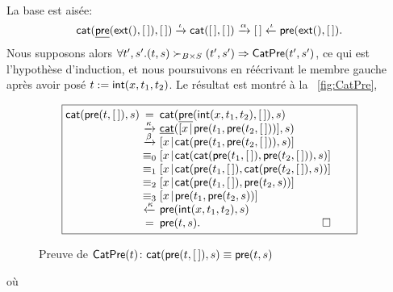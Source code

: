 La base est aisée:
\begin{equation*}
  \fun{cat}(\ufun{pre}(\fun{ext}(),\el),\el)
  \xrightarrow{\smash{\iota}} \fun{cat}(\el,\el)
  \xrightarrow{\smash{\alpha}} \el \xleftarrow{\smash{\iota}}
  \fun{pre}(\fun{ext}(),\el).
\index{cat@\fun{cat/2}}
\end{equation*}
Nous supposons alors \(\forall t',s'.(t,s) \succ_{B \times S} (t',s')
\Rightarrow \textsf{CatPre}({t',s'})\), ce qui est l'hypothèse
d'induction, et nous poursuivons en réécrivant le membre gauche après
avoir posé \(t := \textsf{int}(x,t_1,t_2)\). Le résultat est montré à la
\fig~\vref{fig:CatPre},
\begin{figure}[t]
\begin{equation*}
\boxed{%
\begin{array}{@{}r@{\;}c@{\;}l@{\qquad}}
  \fun{cat}(\fun{pre}(t,\el),s)
& =
& \fun{cat}(\ufun{pre}(\fun{int}(x,t_1,t_2),\el),s)\\
& \xrightarrow{\smash{\kappa}}
& \ufun{cat}(\cons{x}{\fun{pre}(t_1,\fun{pre}(t_2,\el))},s)\\
& \xrightarrow{\smash{\beta}}
& \cons{x}{\fun{cat}(\fun{pre}(t_1,\fun{pre}(t_2,\el)),s)}\\
& \equiv_0
& \cons{x}{\fun{cat}(\fun{cat}(\fun{pre}(t_1,\el),\fun{pre}(t_2,\el)),s)}\\
& \equiv_1
& \cons{x}{\fun{cat}(\fun{pre}(t_1,\el),\fun{cat}(\fun{pre}(t_2,\el),s))}\\
& \equiv_2
& \cons{x}{\fun{cat}(\fun{pre}(t_1,\el),\fun{pre}(t_2,s))}\\
& \equiv_3
& \cons{x}{\fun{pre}(t_1,\fun{pre}(t_2,s))}\\
& \xleftarrow{\smash{\kappa}}
& \fun{pre}(\fun{int}(x,t_1,t_2),s)\\
& =
& \fun{pre}(t,s). \hfill\Box
\end{array}}
\end{equation*}
\caption{Preuve de \(\textsf{CatPre}({t}) \colon
 \textsf{cat}(\textsf{pre}(t,[\,]),s) \equiv \textsf{pre}(t,s)\)}
\label{fig:CatPre}
\end{figure}
où
